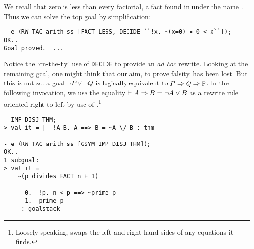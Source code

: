     We recall that zero is less than every factorial, a fact found in
     under the name . Thus we can
    solve the top goal by simplification:
\begin{session}
\begin{verbatim}
- e (RW_TAC arith_ss [FACT_LESS, DECIDE ``!x. ~(x=0) = 0 < x``]);
OK..
Goal proved.  ...
\end{verbatim}
\end{session}
Notice the `on-the-fly' use of \verb+DECIDE+ to provide an \textit{ad hoc}
rewrite. Looking at the remaining goal, one might think that our aim, to
prove falsity, has been lost. But this is not so: a goal 
$\neg P \lor \neg Q$ is logically equivalent to $P \Rightarrow Q \Rightarrow \mathtt{F}$. 
In the following invocation, we use the equality 
$\vdash A \Rightarrow B = \neg A \lor B$ as a rewrite rule oriented right to left by
use of .\footnote{Loosely speaking,  swaps the left and 
right hand sides of any equations it finds.}
\begin{session}
\begin{verbatim}
- IMP_DISJ_THM;
> val it = |- !A B. A ==> B = ~A \/ B : thm

- e (RW_TAC arith_ss [GSYM IMP_DISJ_THM]);
OK..
1 subgoal:
> val it =
    ~(p divides FACT n + 1)
    ------------------------------------
      0.  !p. n < p ==> ~prime p
      1.  prime p
     : goalstack
\end{verbatim}
\end{session}

